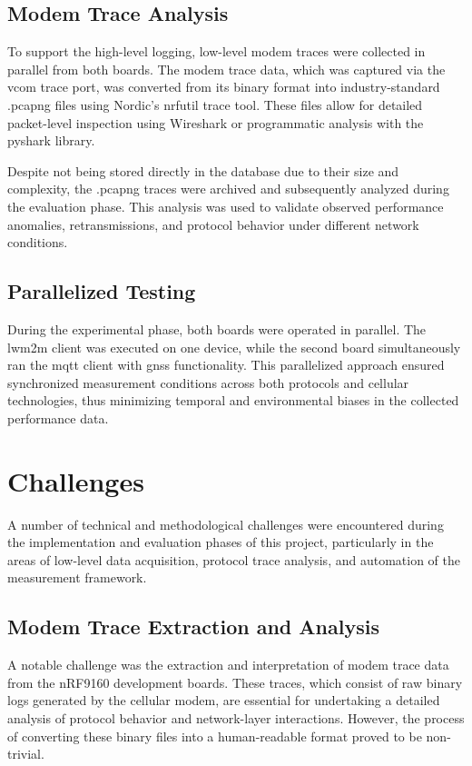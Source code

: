 \documentclass[12pt, english, openany]{book}
\begin{document}
\subsection{Modem Trace Analysis}

To support the high-level logging, low-level modem traces were collected in parallel from both boards. The modem trace data, which was captured via the \gls{vcom} trace port, was converted from its binary format into industry-standard .pcapng files using Nordic's nrfutil trace tool. These files allow for detailed packet-level inspection using Wireshark or programmatic analysis with the pyshark library.

Despite not being stored directly in the database due to their size and complexity, the .pcapng traces were archived and subsequently analyzed during the evaluation phase. This analysis was used to validate observed performance anomalies, retransmissions, and protocol behavior under different network conditions.

\subsection{Parallelized Testing}

During the experimental phase, both boards were operated in parallel. The \gls{lwm2m} client was executed on one device, while the second board simultaneously ran the \gls{mqtt} client with \gls{gnss} functionality. This parallelized approach ensured synchronized measurement conditions across both protocols and cellular technologies, thus minimizing temporal and environmental biases in the collected performance data.

\section{Challenges} \label{sec:challenges}

A number of technical and methodological challenges were encountered during the implementation and evaluation phases of this project, particularly in the areas of low-level data acquisition, protocol trace analysis, and automation of the measurement framework.

\subsection{Modem Trace Extraction and Analysis}

A notable challenge was the extraction and interpretation of modem trace data from the nRF9160 development boards. These traces, which consist of raw binary logs generated by the cellular modem, are essential for undertaking a detailed analysis of protocol behavior and network-layer interactions. However, the process of converting these binary files into a human-readable format proved to be non-trivial.
\end{document}
